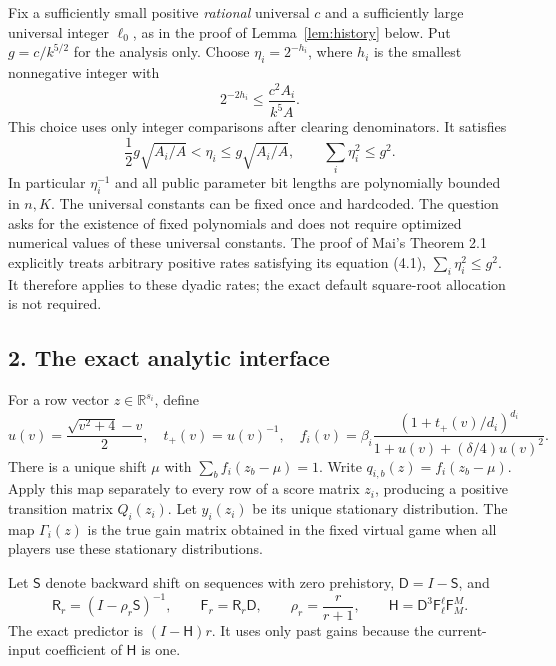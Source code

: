 \documentclass[11pt]{article}
\newcommand{\Sh}{\mathsf S}
\newcommand{\Dif}{\mathsf D}
\newcommand{\Fil}{\mathsf F}
\newcommand{\Res}{\mathsf R}
\newcommand{\Pred}{\mathsf H}
\begin{document}
Fix a sufficiently small positive \emph{rational} universal $c$ and
a sufficiently large universal integer $\ell_0$, as in the proof of
Lemma~\ref{lem:history} below.  Put $g=c/k^{5/2}$ for the analysis only.  Choose
$\eta_i=2^{-h_i}$, where $h_i$ is the smallest nonnegative integer with
\[
 2^{-2h_i}\leq\frac{c^2A_i}{k^5A}.
\]
This choice uses only integer comparisons after clearing denominators.
It satisfies
\begin{equation}\label{eq:rates}
 \frac12g\sqrt{A_i/A}<\eta_i\leq g\sqrt{A_i/A},
 \qquad\sum_i\eta_i^2\leq g^2.
\end{equation}
In particular $\eta_i^{-1}$ and all public parameter bit lengths are
polynomially bounded in $n,K$.  The universal constants can be fixed
once and hardcoded.  The question asks for the existence of fixed
polynomials and does not require optimized numerical values of these
universal constants.  The proof of Mai's Theorem 2.1 explicitly treats
arbitrary positive rates satisfying its equation (4.1),
$\sum_i\eta_i^2\leq g^2$.  It therefore applies to these dyadic rates;
the exact default square-root allocation is not required.

\subsection*{2. The exact analytic interface}
For a row vector $z\in\mathbb R^{s_i}$, define
\[
 u(v)=\frac{\sqrt{v^2+4}-v}{2},\quad
 t_+(v)=u(v)^{-1},\quad
 f_i(v)=\beta_i
 \frac{(1+t_+(v)/d_i)^{d_i}}
 {1+u(v)+(\delta/4)u(v)^2}.
\]
There is a unique shift $\mu$ with
$\sum_b f_i(z_b-\mu)=1$.  Write
$q_{i,b}(z)=f_i(z_b-\mu)$.  Apply this map separately to every row
of a score matrix $z_i$, producing a positive transition matrix
$Q_i(z_i)$.  Let $y_i(z_i)$ be its unique stationary distribution.
The map $\Gamma_i(z)$ is the true gain matrix obtained in the fixed
virtual game when all players use these stationary distributions.

Let $\Sh$ denote backward shift on sequences with zero prehistory,
$\Dif=I-\Sh$, and
\[
 \Res_r=(I-\rho_r\Sh)^{-1},\qquad
 \Fil_r=\Res_r\Dif,\qquad\rho_r=\frac r{r+1},\qquad
 \Pred=\Dif^3\Fil_\ell^\ell\Fil_M^M.
\]
The exact predictor is $(I-\Pred)r$.  It uses only past gains because
the current-input coefficient of $\Pred$ is one.
\end{document}

